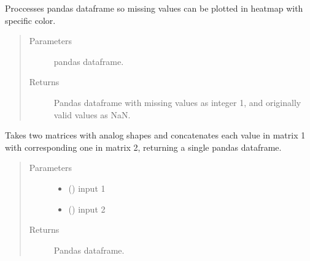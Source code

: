 \documentclass[letterpaper,10pt,english]{sphinxmanual}
\begin{document}

\begin{fulllineitems}
\label{\detokenize{_autosummary/analytics_core.analytics:analytics_core.analytics.wgcnaAnalysis.get_miss_values_df}}
Proccesses pandas dataframe so missing values can be plotted in heatmap with specific color.
\begin{quote}\begin{description}
\item[{Parameters}] \leavevmode
{} \textendash{} pandas dataframe.

\item[{Returns}] \leavevmode
Pandas dataframe with missing values as integer 1, and originally valid values as NaN.

\end{description}\end{quote}

\end{fulllineitems}


\begin{fulllineitems}
\label{\detokenize{_autosummary/analytics_core.analytics:analytics_core.analytics.wgcnaAnalysis.paste_matrices}}
Takes two matrices with analog shapes and concatenates each value in matrix 1 with corresponding one in matrix 2, returning a single pandas dataframe.
\begin{quote}\begin{description}
\item[{Parameters}] \leavevmode\begin{itemize}
\item {} 
 () \textendash{} input 1

\item {} 
 () \textendash{} input 2

\end{itemize}

\item[{Returns}] \leavevmode
Pandas dataframe.

\end{description}\end{quote}

\end{fulllineitems}
\end{document}
